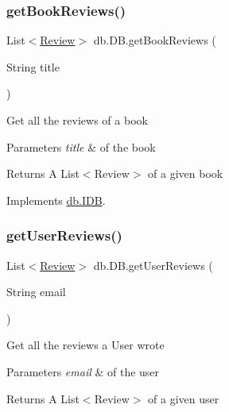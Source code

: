 \mbox{\label{classdb_1_1_d_b_a02a42ee97d8e7189733dfc720a05452e}} 
\subsubsection{\texorpdfstring{get\+Book\+Reviews()}{getBookReviews()}}
{\footnotesize\ttfamily List$<$\hyperlink{classserver_1_1data_1_1_review}{Review}$>$ db.\+D\+B.\+get\+Book\+Reviews (\begin{DoxyParamCaption}\item[{String}]{title }\end{DoxyParamCaption})}

Get all the reviews of a book 
\begin{DoxyParams}{Parameters}
{\em title} & of the book \\
\hline
\end{DoxyParams}
\begin{DoxyReturn}{Returns}
A List$<$\+Review$>$ of a given book 
\end{DoxyReturn}


Implements \hyperlink{interfacedb_1_1_i_d_b_a6b8fda48df77b542b8713bc4f035bccf}{db.\+I\+DB}.

\mbox{\label{classdb_1_1_d_b_a9ef4c302b91da17852f09a27a90fb4b5}} 
\subsubsection{\texorpdfstring{get\+User\+Reviews()}{getUserReviews()}}
{\footnotesize\ttfamily List$<$\hyperlink{classserver_1_1data_1_1_review}{Review}$>$ db.\+D\+B.\+get\+User\+Reviews (\begin{DoxyParamCaption}\item[{String}]{email }\end{DoxyParamCaption})}

Get all the reviews a User wrote 
\begin{DoxyParams}{Parameters}
{\em email} & of the user \\
\hline
\end{DoxyParams}
\begin{DoxyReturn}{Returns}
A List$<$\+Review$>$ of a given user 
\end{DoxyReturn}


